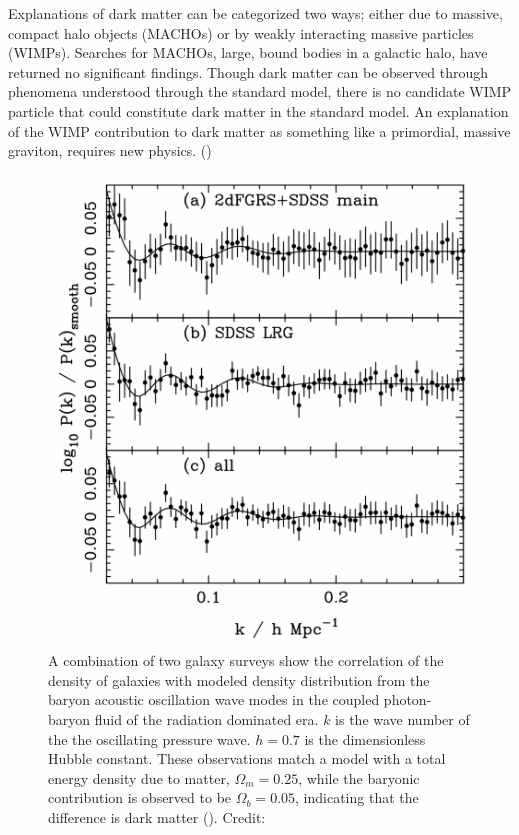 \documentclass{paper}
\begin{document}
  

  Explanations of dark matter can be categorized two ways; either due to 
  massive, compact halo objects (MACHOs) or by weakly interacting massive 
  particles (WIMPs). Searches for MACHOs, large, bound bodies in a galactic 
  halo, have returned no significant findings. Though dark matter can be 
  observed through phenomena understood through the standard model, there is 
  no candidate WIMP particle that could constitute dark matter in the standard 
  model. An explanation of the WIMP contribution to dark matter as something 
  like a primordial, massive graviton, requires new physics.
  (\cite{PhysRevLett.128.081806})

  \begin{figure}[H]
    \begin{centering}
    \includegraphics[scale=0.6]{DM-BAO.pdf}
    \caption{A combination of two galaxy surveys show the correlation of
      the density of galaxies with modeled density distribution from the
      baryon acoustic oscillation wave modes in the coupled photon-baryon
      fluid of the radiation dominated era. $k$ is the wave number of the
      the oscillating pressure wave. \(h = 0.7\) is the dimensionless Hubble
      constant. These observations match a model with a total energy density
      due to matter, \(\Omega_m = 0.25\), while the baryonic contribution is
      observed to be \(\Omega_b = 0.05\), indicating that the 
      difference is dark matter (\cite{Eisenstein_2005}).
    Credit: \cite{2007MNRAS.381.1053P}}
    \label{fig:DM-BAO}
    \end{centering}
  \end{figure}
\end{document}
